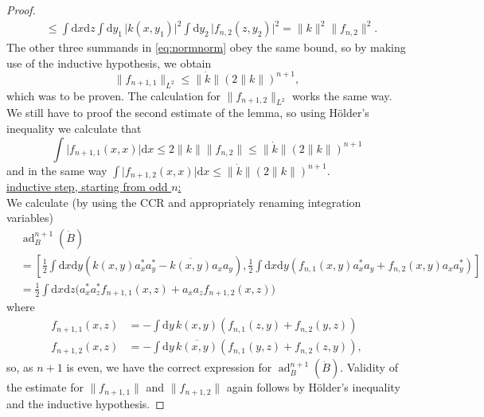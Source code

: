 \documentclass[11pt,a4paper,draft,DIV11]{scrartcl}	%
\newcommand{\ad}{\operatorname{ad}}	%
\newcommand{\di}{\textrm{d}}		%
\newcommand{\cc}[1]{\overline{#1}}	%
\newcommand{\norm}[1]{\lVert#1\rVert}	%
\newcommand{\bd}{\begin{displaymath}}			%
\newcommand{\ed}{\end{displaymath}}
\newcommand{\eqr}[1]{\eqref{eq:#1}}			%
\begin{document}
\begin{proof}
\begin{align*}
& \leq \int \di x \di z \int \di y_1\,\lvert k(x,y_1) \rvert^2 \int \di y_2\,\lvert f_{n,2}(z,y_2) \rvert^2 = \norm{k}^2 \norm{f_{n,2}}^2. 
\end{align*}
The other three summands in \eqr{normnorm} obey the same bound, so by making use of the inductive hypothesis, we obtain
\bd
\norm{f_{n+1,1}}_{L^2} \leq \norm{\dot k} (2\norm{k})^{n+1},
\ed
which was to be proven. The calculation for $\norm{f_{n+1,2}}_{L^2}$ works the same way. We still have to proof the second estimate of the lemma, so using H\"older's inequality we calculate that
\[
\int \lvert f_{n+1,1}(x,x) \rvert \di x \leq 2\norm{k} \norm{f_{n,2}} \leq \norm{\dot k} (2\norm{k})^{n+1}
\]
and in the same way $\int \lvert f_{n+1,2}(x,x) \rvert \di x \leq \norm{\dot k}(2\norm{k})^{n+1}$.\\
\underline{inductive step, starting from odd $n$:}\\
We calculate (by using the CCR and appropriately renaming integration variables)
\begin{align*}
& \ad^{n+1}_B(\dot B)\\
& = \left[ \frac{1}{2}\int \di x \di y \left( k(x,y)a^\ast_x a^\ast_y - \cc{k(x,y)} a_x a_y \right) , \frac{1}{2}\int \di x\di y \left( f_{n,1}(x,y) a^\ast_x a_y + f_{n,2}(x,y) a_x a^\ast_y \right) \right] \\
& = \frac{1}{2} \int \di x\di z \big( a^\ast_x a^\ast_z f_{n+1,1}(x,z) + a_x a_z f_{n+1,2}(x,z) \big)
\end{align*}
where
\begin{equation}
\label{eq:odd}
\begin{split}
f_{n+1,1}(x,z) & = - \int \di y\, k(x,y)\left( f_{n,1}(z,y) + f_{n,2}(y,z) \right) \\
f_{n+1,2}(x,z) & = - \int \di y\, \cc{k(x,y)}\left( f_{n,1}(y,z) + f_{n,2}(z,y) \right),
\end{split}
\end{equation}
so, as $n+1$ is even, we have the correct expression for $\ad^{n+1}_B(\dot B)$. Validity of the estimate for $\norm{f_{n+1,1}}$ and $\norm{f_{n+1,2}}$ again follows by H\"older's inequality and the inductive hypothesis.
\end{proof}
\end{document}
